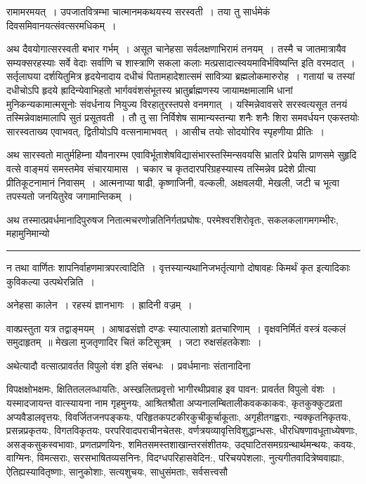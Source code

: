 \documentclass[11pt, openany]{book}
\begin{document}
\newpage

\noindent
रामामरमयत्~। उपजातवित्रम्भा चात्मानमकथयस्य सरस्वती~। तया तु सार्धमेकं दिवसमिवानयत्संवत्सरमधिकम्~।

अथ दैवयोगात्सरस्वती बभार गर्भम्~। असूत चानेहसा सर्वलक्षणाभिरामं तनयम्~। तस्मै च जातमात्रायैव {\haq सम्यक्सरहस्याः सर्वे वेदाः सर्वाणि च शास्त्राणि सकला कलाः मत्प्रसादात्स्वयमाविर्भविष्यन्ति} इति वरमदात्~। सर्तृलाघया दर्शयितुमित्र हृदयेनादाय दधीचं पितामहादेशात्समं सावित्र्या ब्रह्मलोकमारुरोह~। गतायां च तस्यां दधीचोऽपि हृदये ह्रादिन्येवाभिहतो भार्गववंशसंभूतस्य भ्रातुर्ब्राह्मणस्य जायामक्षमालामि धानां मुनिकन्यकामात्मसूनोः संवर्धनाय नियुज्य विरहातुरस्तपसे वनमगात्~। यस्मिन्नेवावसरे सरस्वत्यसूत तनयं तस्मिन्नेवाक्षमालापि सुतं प्रसूतवती~। तौ तु सा निर्विशेष सामान्यस्तन्या शनैः शनैः शिरा समवर्धयन एकस्तयोः सारस्वताख्य एवाभवत्, द्वितीयोऽपि वत्सनामाभवत्~। आसीच तयोः सोदयोरिव स्पृहणीया प्रीतिः~।

अथ सारस्वतो मातुर्महिम्ना यौवनारम्भ एवाविर्भूताशेषविद्यासंभारस्तस्मिन्सवयसि भ्रातरि प्रेयसि प्राणसमे सुहृदि वत्से वाङ्मयं समस्तमेव संचारयामास~। चकार च कृतदारपरिग्रहस्यास्य तस्मिन्नेव प्रदेशे प्रीत्या प्रीतिकूटनामानं निवासम्~। आत्मनाप्या षाढी, कृष्णाजिनी, वल्कली, अक्षवलयी, मेखली, जटी च भूत्वा तपस्यतो जनयितुरेव जगामान्तिकम्~।

अथ तस्मात्प्रवर्धमानादिपुरुषज नितात्मचरणोन्नतिनिर्गतप्रघोषः, परमेश्वरशिरोवृतः, सकलकलागमगम्भीरः, महामुनिमान्यो

\vspace{2mm}
\hrule

\noindent
{\s न तथा वार्णितः शापनिर्वाहणमात्रपरत्वादिति~। वृत्तस्यान्यथानिजभर्तृत्यागो दोषावहः किमर्थं कृत इत्यादिकाः कुविकल्या उत्पथेरन्निति~।

अनेहसा कालेन~। रहस्यं ज्ञानभागः~। ह्रादिनी वज्रम्~।

वाक्प्रस्तुता यत्र तद्वाङ्मयम्~। {\qt आषाढसंज्ञो दण्डः स्यात्पालाशो व्रतचारिणाम्~। वृक्षवनिर्मितं वस्त्रं वल्कलं समुदाहृतम्~॥} मेखला मुजतृणादिर चितं कटिसूत्रम्~। जटा रुक्षसंहतकेशाः~।

अथेत्यादौ वत्सात्प्रावर्तत विपुलो वंश इति संबन्धः~। प्रवर्धमानाः संतानादिना}

\newpage

\noindent
विपक्षक्षोभक्षमः, क्षितितललव्धायतिः, अस्खलितप्रवृत्तो भागीरथीप्रवाह इव पावन: प्रावर्तत विपुलो वंशः~। यस्मादजायन्त वात्स्यायना नाम गृहमुनयः, आश्रितश्रौता अप्यनालम्बितालीकवककाकवः, कृतकुक्कुटव्रता अप्यवैडालवृत्तयः, विवर्जितजनपङ्कयः, परिहृतकपटकीरकुचीकूर्चाकूताः, अगृहीतगह्वराः, न्यक्कृतनिकृतयः, प्रसन्नप्रकृतयः, विगतविकृतयः, परपरिवादपराचीनचेतसः, वर्णत्रयव्यावृत्तिविशुद्धान्धसः, धीरधिषणावधूताध्येषणाः, असङ्कसुकस्वभावाः, प्रणतप्रणयिनः, शमितसमस्तशाखान्तरसंशीतयः, उद्घाटितसमग्रग्रन्थार्थमन्थयः, कवयः, वाग्मिनः, विमत्सराः, सरसभाषितव्यसनिनः, विदग्धपरिहासवेदिन:, परिचयपेशलाः, नुत्यगीतवादित्रेष्ववाह्याः, ऐतिह्यस्यावितृष्णाः, सानुकोशाः, सत्यशुचयः, साधुसंमताः, सर्वसत्त्वसौ\textendash
\end{document}
